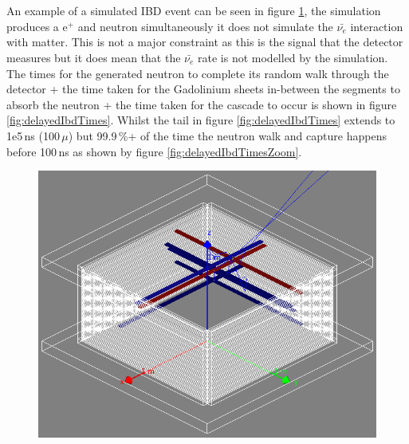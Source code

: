 \\\\An example of a simulated IBD event can be seen in figure \ref{fig:simultaedIbdEvent}, the simulation produces a e$^+$ and neutron simultaneously it does not simulate the $\bar{\nu_e}$ interaction with matter. This is not a major constraint as this is the signal that the detector measures but it does mean that the $\bar{\nu_e}$ rate is not modelled by the simulation. The times for the generated neutron to complete its random walk through the detector + the time taken for the Gadolinium sheets in-between the segments to absorb the neutron + the time taken for the cascade to occur is shown in figure \ref{fig:delayedIbdTimes}. Whilst the tail in figure \ref{fig:delayedIbdTimes} extends to 1e5\,ns (100\,$\mu$) but 99.9\,\%+ of the time the neutron walk and capture happens before 100\,ns as shown by figure \ref{fig:delayedIbdTimesZoom}.

\begin{figure}[!h]
 \centering
 \includegraphics[width=0.7\linewidth]{Chapter4/Figs/Raster/simultaedIbdEvent.png}
 \label{fig:simultaedIbdEvent}
\end{figure} 


